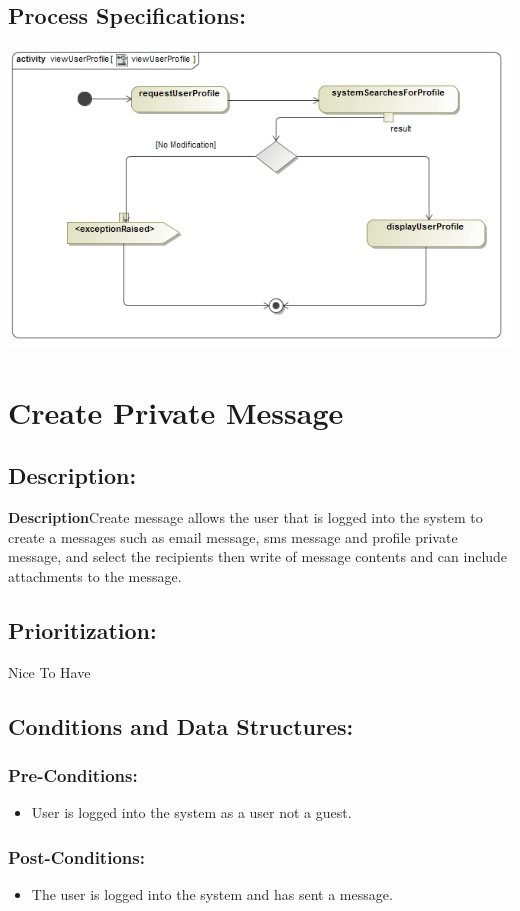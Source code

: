 \documentclass[a4paper,11pt]{article}
\begin{document}
\subsection{Process Specifications:} 
\includegraphics[width=1\linewidth]{./Images/UserProfile/ViewUserProfileActivity}

\section{Create Private Message}
\subsection*{Description:}
\textbf{Description}Create message allows the user that is logged into the system to create a messages such as email message, sms message and profile private message, and select the recipients then write of message contents and can include attachments to the message. 
\subsection{Prioritization:} 
\textbf{}Nice To Have
\subsection{Conditions and Data Structures:}
\subsubsection*{Pre-Conditions:}
\begin{itemize}
\item User is logged into the system as a user not a guest. 
\end{itemize}
\subsubsection*{Post-Conditions:}
\begin{itemize}
\item The user is logged into the system and has sent a message.
\end{itemize}
\end{document}

